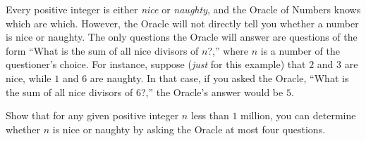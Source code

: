 Every positive integer is either \emph{nice} or \emph{naughty}, and the Oracle of Numbers knows which are which. However, the Oracle will not directly tell you whether a number is nice or naughty. The only questions the Oracle will answer are questions of the form ``What is the sum of all nice divisors of $n$?,'' where $n$ is a number of the questioner's choice. For instance, suppose (\emph{just} for this example) that $2$ and $3$ are nice, while $1$ and $6$ are naughty. In that case, if you asked the Oracle, ``What is the sum of all nice divisors of $6$?,'' the Oracle's answer would be $5$.

Show that for any given positive integer $n$ less than $1$ million, you can determine whether $n$ is nice or naughty by asking the Oracle at most four questions.